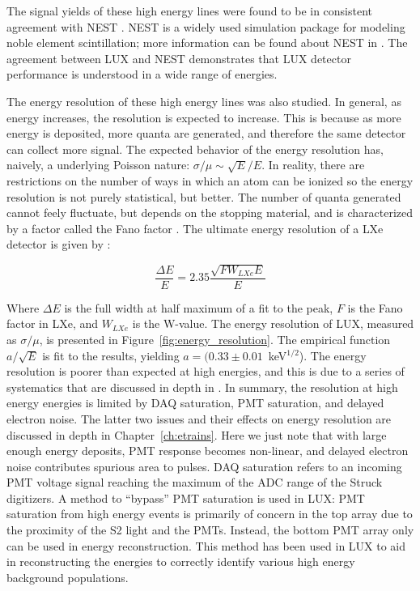 The signal yields of these high energy lines were found to be in consistent agreement with \ac{NEST} \cite{LUX:YieldsAndRecombination}. \ac{NEST} is a widely used simulation package for modeling noble element scintillation; more information can be found about \ac{NEST} in \cite{Szydagis2011}. The agreement between \ac{LUX} and \ac{NEST} demonstrates that \ac{LUX} detector performance is understood in a wide range of energies. 

The energy resolution of these high energy lines was also studied. In general, as energy increases, the resolution is expected to increase. This is because as more energy is deposited, more quanta are generated, and therefore the same detector can collect more signal. The expected behavior of the energy resolution has, naively, a underlying Poisson nature: $\sigma / \mu \sim \sqrt{E}/E$. In reality, there are restrictions on the number of ways in which an atom can be ionized so the energy resolution is not purely statistical, but better. The number of quanta generated cannot feely fluctuate, but depends on the stopping material, and is characterized by a factor called the Fano factor \cite{Fano1947} \cite{Aprile2010}. The ultimate energy resolution of a \ac{LXe} detector is given by \cite{Aprile2010}: 

\begin{equation}
\frac{\Delta E}{E} = 2.35 \frac{\sqrt{F W_{LXe} E} }{E} 
\end{equation}

Where $\Delta E$ is the full width at half maximum of a fit to the peak, $F$ is the Fano factor in \ac{LXe}, and $W_{LXe}$ is the W-value. The energy resolution of \ac{LUX}, measured as $\sigma / \mu$, is presented in Figure~\ref{fig:energy_resolution}. The empirical function $a / \sqrt{E} $ is fit to the results, yielding $a = (0.33 \pm 0.01$~keV$^{1/2}$). The energy resolution is poorer than expected at high energies, and this is due to a series of systematics that are discussed in depth in \cite{LUX:YieldsAndRecombination}. In summary, the resolution at high energy energies is limited by \ac{DAQ} saturation, \ac{PMT} saturation, and delayed electron noise. The latter two issues and their effects on energy resolution are discussed in depth in Chapter~\ref{ch:etrains}. Here we just note that with large enough energy deposits, \ac{PMT} response becomes non-linear, and delayed electron noise contributes spurious area to pulses. \ac{DAQ} saturation refers to an incoming \ac{PMT} voltage signal reaching the maximum of the \ac{ADC} range of the Struck digitizers. A method to ``bypass'' \ac{PMT} saturation is used in \ac{LUX}: \ac{PMT} saturation from high energy events is primarily of concern in the top array due to the proximity of the S2 light and the \ac{PMT}s. Instead, the bottom \ac{PMT} array only can be used in energy reconstruction. This method has been used in \ac{LUX} to aid in reconstructing the energies to correctly identify various high energy background populations.

